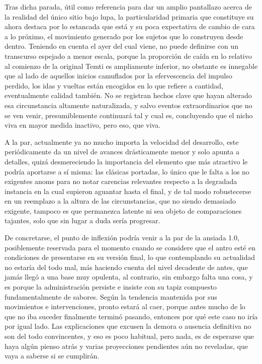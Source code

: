 \documentclass[
]{book}
\begin{document}
Tras dicha parada, útil como referencia para dar un amplio pantallazo acerca de la realidad del único sitio bajo lupa, la particularidad primaria que constituye su ahora destaca por lo estancada que está y su poca expectativa de cambio de cara a lo próximo, el movimiento generado por los sujetos que lo construyen desde dentro. Teniendo en cuenta el ayer del cual viene, no puede definirse con un transcurso espejado a menor escala, porque la proporción de caída en lo relativo al comienzo de la original Temti es ampliamente inferior, no obstante es innegable que al lado de aquellos inicios camuflados por la efervescencia del impulso perdido, los idas y vueltas están encogidos en lo que refiere a cantidad, eventualmente calidad también. No se registran hechos clave que hayan alterado esa circunstancia altamente naturalizada, y salvo eventos extraordinarios que no se ven venir, presumiblemente continuará tal y cual es, concluyendo que el nicho viva en mayor medida inactivo, pero eso, que viva.

A la par, actualmente ya no mucho importa la velocidad del desarrollo, este periódicamente da un nivel de avances drásticamente menor y solo apunta a detalles, quizá desmereciendo la importancia del elemento que más atractivo le podría aportarse a sí misma: las clásicas portadas, lo único que le falta a los no exigentes anoms para no notar carencias relevantes respecto a la degradada instancia en la cual supieron aguantar hasta el final, y de tal modo robustecerse en un reemplazo a la altura de las circunstancias, que no siendo demasiado exigente, tampoco es que permanezca latente ni sea objeto de comparaciones tajantes, solo que sin lugar a duda sería progresar.

De concretarse, el punto de inflexión podría venir a la par de la ansiada 1.0, posiblemente reservada para el momento cuando se considere que el antro esté en condiciones de presentarse en su versión final, lo que contemplando su actualidad no estaría del todo mal, más haciendo cuenta del nivel decadente de antes, que jamás llegó a una base muy opulenta, al contrario, sin embargo falta una cosa, y es porque la administración persiste e insiste con su tapiz compuesto fundamentalmente de sabores. Según la tendencia mantenida por sus movimientos e intervenciones, pronto estará al caer, porque antes mucho de lo que no iba suceder finalmente terminó pasando, entonces por qué este caso no iría por igual lado. Las explicaciones que excusen la demora o ausencia definitiva no son del todo convincentes, y eso es poco habitual, pero nada, es de esperarse que haya algún pienso atrás y varias proyecciones pendientes aún no reveladas, que vaya a saberse si se cumplirán.
\end{document}
